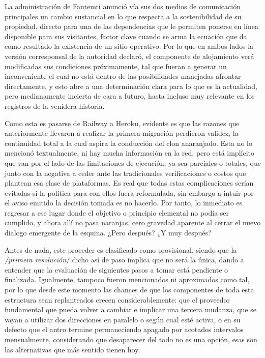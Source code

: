 \documentclass[
]{book}
\begin{document}
La administración de Fantemti anunció vía sus dos medios de comunicación principales un cambio sustancial en lo que respecta a la sostenibilidad de su propiedad, directo para una de las dependencias que le permiten ponerse en línea disponible para sus visitantes, factor clave cuando se arma la ecuación que da como resultado la existencia de un sitio operativo. Por lo que en ambos lados la versión corresponsal de la autoridad declaró, el componente de alojamiento verá modificadas sus condiciones próximamente, tal que fueran a generar un inconveniente el cual no está dentro de las posibilidades manejadas afrontar directamente, y esto abre a una determinación clara para lo que es la actualidad, pero medianamente incierta de cara a futuro, hasta incluso muy relevante en los registros de la venidera historia.

Como esta es pasarse de Railway a Heroku, evidente es que las razones que anteriormente llevaron a realizar la primera migración perdieron validez, la continuidad total a la cual aspira la conducción del clon anaranjado. Esta no lo mencionó textualmente, ni hay mucha información en la red, pero está implícito que van por el lado de las limitaciones de ejecución, ya sea parciales o totales, que junto con la negativa a ceder ante las tradicionales verificaciones o costos que plantean esa clase de plataformas. Es real que todas estas complicaciones serían evitadas si la política para con ellos fuera reformulada, sin embargo a intuir por el aviso emitido la decisión tomada es no hacerlo. Por tanto, lo inmediato es regresar a ese lugar donde el objetivo o principio elemental no podía ser cumplido, y ahora allí no pasa naranjas, cero gravedad aparente al cerrar el nuevo dialogo emergente de la esquina. ¿Pero después? ¿Y muy después?

Antes de nada, este proceder es clasificado como provisional, siendo que la \emph{/primera resolución}/ dicho así de paso implica que no será la única, dando a entender que la evaluación de siguientes pasos a tomar está pendiente o finalizada. Igualmente, tampoco fueron mencionados ni aproximados como tal, por lo que desde este momento las chances de que los componentes de toda esta estructura sean replanteados crecen considerablemente: que el proveedor fundamental que pueda volver a cambiar e implicar una tercera mudanza, que se vayan a utilizar dos direcciones en paralelo o según cual esté activa, o en su defecto que el antro termine permaneciendo apagado por acotados intervalos mensualmente, considerando que desaparecer del todo no es una opción, esas son las alternativas que más sentido tienen hoy.
\end{document}
